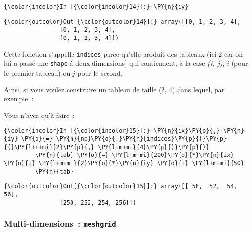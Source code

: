     \begin{Verbatim}[commandchars=\\\{\}]
{\color{incolor}In [{\color{incolor}14}]:} \PY{n}{iy}
\end{Verbatim}


\begin{Verbatim}[commandchars=\\\{\}]
{\color{outcolor}Out[{\color{outcolor}14}]:} array([[0, 1, 2, 3, 4],
                [0, 1, 2, 3, 4],
                [0, 1, 2, 3, 4]])
\end{Verbatim}
            
    Cette fonction s'appelle \texttt{indices} parce qu'elle produit des
tableaux (ici 2 car on lui a passé une \texttt{shape} à deux dimensions)
qui contiennent, à la case \emph{(i,~j)}, \(i\) (pour le premier
tableau) ou \(j\) pour le second.

    Ainsi, si vous voulez construire un tableau de taille (2, 4) dans
lequel, par exemple~:

\begin{Shaded}
\begin{Highlighting}[]
\OperatorTok{=} \OperatorTok{*}\OperatorTok{+} \OperatorTok{*}\OperatorTok{+} 
\end{Highlighting}
\end{Shaded}

Vous n'avez qu'à faire~:

    \begin{Verbatim}[commandchars=\\\{\}]
{\color{incolor}In [{\color{incolor}15}]:} \PY{n}{ix}\PY{p}{,} \PY{n}{iy} \PY{o}{=} \PY{n}{np}\PY{o}{.}\PY{n}{indices}\PY{p}{(}\PY{p}{(}\PY{l+m+mi}{2}\PY{p}{,} \PY{l+m+mi}{4}\PY{p}{)}\PY{p}{)}
         \PY{n}{tab} \PY{o}{=} \PY{l+m+mi}{200}\PY{o}{*}\PY{n}{ix} \PY{o}{+} \PY{l+m+mi}{2}\PY{o}{*}\PY{n}{iy} \PY{o}{+} \PY{l+m+mi}{50}
         \PY{n}{tab}
\end{Verbatim}


\begin{Verbatim}[commandchars=\\\{\}]
{\color{outcolor}Out[{\color{outcolor}15}]:} array([[ 50,  52,  54,  56],
                [250, 252, 254, 256]])
\end{Verbatim}
            
    \hypertarget{multi-dimensions-meshgrid}{%
\subsubsection{\texorpdfstring{Multi-dimensions~:
\texttt{meshgrid}}{Multi-dimensions~: meshgrid}}\label{multi-dimensions-meshgrid}}


